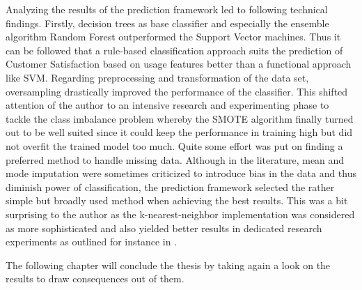 Analyzing the results of the prediction framework led to following technical findings. Firstly, decision trees as base classifier and especially the ensemble algorithm Random Forest outperformed the Support Vector machines. Thus it can be followed that a rule-based classification approach suits the prediction of Customer Satisfaction based on usage features better than a functional approach like SVM. Regarding preprocessing and transformation of the data set, oversampling drastically improved the performance of the classifier. This shifted attention of the author to an intensive research and experimenting phase to tackle the class imbalance problem whereby the SMOTE algorithm finally turned out to be well suited since it could keep the performance in training high but did not overfit the trained model too much. Quite some effort was put on finding a preferred method to handle missing data. Although in the literature, mean and mode imputation were sometimes criticized to introduce bias in the data and thus diminish power of classification, the prediction framework selected the rather simple but broadly used method when achieving the best results. This was a bit surprising to the author as the k-nearest-neighbor implementation was considered as more sophisticated and also yielded better results in dedicated research experiments as outlined for instance in \cite{batista2003analysis}.

The following chapter will conclude the thesis by taking again a look on the results to draw consequences out of them. 